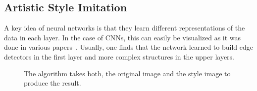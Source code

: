 \subsection{Artistic Style Imitation}
A key idea of neural networks is that they learn different representations of
the data in each layer. In the case of \glspl{CNN}, this can easily be
visualized as it was done in various papers~\cite{zeiler2014visualizing}.
Usually, one finds that the network learned to build edge detectors in the
first layer and more complex structures in the upper layers.

\begin{figure}
\centering
{}%

\caption{The algorithm takes both, the original image and the style image  to produce the result.}
\label{fig:neural-style}
\end{figure}

